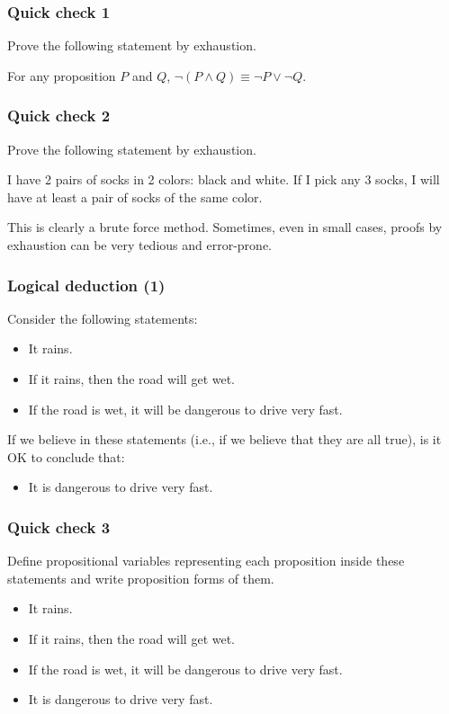 \begin{frame}\frametitle{Quick check 1}
  Prove the following statement by exhaustion.
  \begin{tcolorbox}
    For any proposition $P$ and $Q$, $\neg (P\wedge Q)\equiv \neg P
    \vee \neg Q$.
  \end{tcolorbox}
  \vspace{2.5in}
\end{frame}

\begin{frame}\frametitle{Quick check 2}
  Prove the following statement by exhaustion.
  \begin{tcolorbox}
    I have 2 pairs of socks in 2 colors: black and white.  If I pick
    any 3 socks, I will have at least a pair of socks of the same
    color.
  \end{tcolorbox}
  \vspace{1.5in}
  \pause

  This is clearly a brute force method.  Sometimes, even in small
  cases, proofs by exhaustion can be very tedious and error-prone.
\end{frame}

\begin{frame}\frametitle{Logical deduction (1)}
  Consider the following statements:

  \begin{itemize}
  \item It rains.
  \item If it rains, then the road will get wet.
  \item If the road is wet, it will be dangerous to drive very fast.
  \end{itemize}

  \pause
  If we believe in these statements (i.e., if we believe that they are
  all true), is it OK to conclude that:

  \begin{itemize}
  \item It is dangerous to drive very fast.
  \end{itemize}

\end{frame}

\begin{frame}\frametitle{Quick check 3}
  Define propositional variables representing each proposition inside
  these statements and write proposition forms of them.

  \begin{itemize}
  \item It rains.
  \item If it rains, then the road will get wet.
  \item If the road is wet, it will be dangerous to drive very fast.
  \item It is dangerous to drive very fast.
  \end{itemize}

\end{frame}

